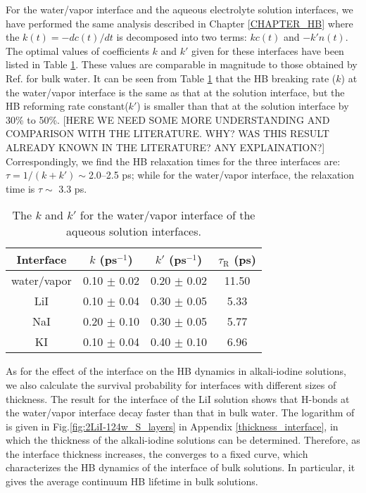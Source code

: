 For the water/vapor interface and the aqueous electrolyte solution interfaces, 
we have performed the same analysis described in Chapter \ref{CHAPTER_HB} where the $k(t)=-dc(t)/dt$ is decomposed into two terms: $kc(t)$ and $-k'n(t)$. 
The optimal values of coefficients $k$ and $k'$ given for these interfaces have been listed in Table \ref{tab:k_k_prime_pure_and_solutions}. 
These values are comparable in magnitude to those obtained by Ref. for bulk water. %
It can be seen from Table \ref{tab:k_k_prime_pure_and_solutions} that the HB breaking rate ($k$) at the water/vapor interface is the same as 
that at the solution interface, but the HB reforming rate constant($k'$) is smaller than that at the solution interface by 30\% to 50\%. 
[HERE  WE NEED SOME MORE UNDERSTANDING AND COMPARISON WITH THE LITERATURE. WHY? WAS THIS RESULT ALREADY KNOWN IN THE LITERATURE? ANY EXPLAINATION?]
Correspondingly, we find the HB relaxation times for the three interfaces are: $\tau={1}/{(k+k')} \sim $2.0--2.5 ps;
while for the water/vapor interface, the relaxation time is $\tau \sim $ 3.3 ps. 

%
\begin{table}[htbp]
\centering
\caption{\label{tab:k_k_prime_pure_and_solutions} 
    The $k$ and $k'$ for the water/vapor interface of the aqueous solution interfaces.} 
\begin{tabular}{cccc}
 Interface & $k$ (ps$^{-1}$) & $k'$ (ps$^{-1}$) & $\tau_{\text{R}}$ (ps) \\
\hline
  water/vapor & 0.10 $\pm$ 0.02 & 0.20 $\pm$ 0.02 & 11.50 \\
  LiI & 0.10 $\pm$ 0.04 & 0.30 $\pm$ 0.05 & 5.33 \\
  NaI & 0.20 $\pm$ 0.10 & 0.30 $\pm$ 0.05 & 5.77 \\
  KI  & 0.10 $\pm$ 0.04 & 0.40 $\pm$ 0.10 & 6.96 
\end{tabular}
\end{table}
As for the effect of the interface on the HB dynamics in alkali-iodine solutions,
we also calculate the survival probability for interfaces with different sizes of thickness. 
The result for the interface of the LiI solution shows that H-bonds at the water/vapor interface decay faster than that in bulk water.
The logarithm of \SHB is given in Fig.\thinspace\ref{fig:2LiI-124w_S_layers} in Appendix \ref{thickness_interface}, 
in which the thickness of the alkali-iodine solutions can be determined.
Therefore, as the interface thickness increases, the \SHB converges to a fixed curve, 
which characterizes the HB dynamics of the interface of bulk solutions. 
In particular, it gives the average continuum HB lifetime in bulk solutions.
